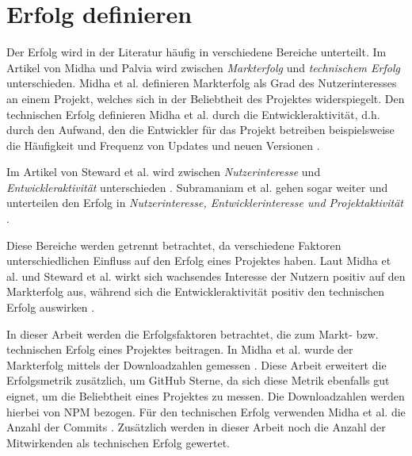 \section{Erfolg definieren}


Der Erfolg wird in der Literatur häufig in verschiedene Bereiche unterteilt.
Im Artikel von Midha und Palvia wird zwischen \textit{Markterfolg} und \textit{technischem Erfolg}
unterschieden.
Midha et al. definieren Markterfolg
als Grad des Nutzerinteresses an einem Projekt, %
welches sich in der Beliebtheit des Projektes widerspiegelt.
Den technischen Erfolg definieren Midha et al. durch die Entwickleraktivität, d.h. durch den Aufwand,
den die Entwickler für das Projekt betreiben %
beispielsweise die Häufigkeit und Frequenz von Updates und neuen Versionen
\cite{midhaFactorsAffectingSuccess2012}. %


Im Artikel von Steward et al. wird zwischen \textit{Nutzerinteresse} und \textit{Entwickleraktivität} unterschieden
\cite{stewartImpactsLicenseChoice2006a}. %
Subramaniam et al. gehen sogar weiter und unterteilen den Erfolg in
\textit{Nutzerinteresse, Entwicklerinteresse und Projektaktivität}
\cite{subramaniamDeterminantsOpenSource2009}. %

Diese Bereiche werden getrennt betrachtet, da verschiedene Faktoren unterschiedlichen Einfluss
auf den Erfolg eines Projektes haben.
Laut Midha et al. und Steward et al. wirkt sich wachsendes Interesse der Nutzern positiv auf den
Markterfolg aus, während sich die Entwickleraktivität positiv den technischen Erfolg auswirken
\cite{midhaFactorsAffectingSuccess2012, %
    stewartImpactsLicenseChoice2006a}. %


In dieser Arbeit werden die Erfolgsfaktoren betrachtet, die zum Markt- bzw. technischen Erfolg
eines Projektes beitragen.
In Midha et al. wurde der Markterfolg mittels der Downloadzahlen gemessen \cite{midhaFactorsAffectingSuccess2012}. %
Diese Arbeit erweitert die Erfolgsmetrik zusätzlich, um GitHub Sterne, da sich diese Metrik ebenfalls gut
eignet, um die Beliebtheit eines Projektes zu messen. Die Downloadzahlen werden hierbei von NPM bezogen.
Für den technischen Erfolg verwenden Midha et al. die Anzahl der Commits \cite{midhaFactorsAffectingSuccess2012}. 
Zusätzlich werden in dieser Arbeit noch die Anzahl der Mitwirkenden als technischen Erfolg gewertet.


